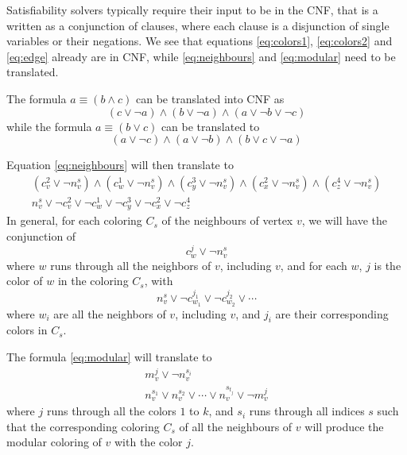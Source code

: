 \documentclass[letterpaper]{article}
\let\vel\vee
\let\at\wedge
\begin{document}
Satisfiability solvers typically require their input to be in the \ac{CNF}, that is
a written as a conjunction of clauses, where each clause is a disjunction of
single variables or their negations.  We see that equations \eqref{eq:colors1},
\eqref{eq:colors2} and \eqref{eq:edge} already are in \ac{CNF}, while
\eqref{eq:neighbours} and \eqref{eq:modular} need to be translated. 

The formula $a \equiv (b \at c)$ can be translated into \ac{CNF} as 
\begin{equation}
   \left(c \vee \neg a\right) \wedge \left(b \vee \neg a\right) \wedge \left(a \vee \neg b \vee \neg c\right)
   \label{eq:trans1}
\end{equation}
while the formula $a \equiv (b \vel c)$ can be translated to 
\begin{equation}
   \left(a \vee \neg c\right) \wedge \left(a \vee \neg b\right) \wedge \left(b \vee c \vee \neg a\right)
   \label{eq:trans2}
\end{equation}

Equation \eqref{eq:neighbours} will then translate to 
\begin{gather}
   \label{eq:neighbour_trans_1} (c_v^2 \vel \neg n_v^s) \at (c_w^1 \vel \neg n_v^s) \at (c_y^3 \vel \neg
   n_v^s) \at (c_x^2 \vel \neg n_v^s) \at (c_z^4 \vel \neg n_v^s)\\
   \label{eq:neighbour_trans_2} n_v^s \vel \neg c_v^2 \vel \neg c_w^1 \vel \neg c_y^3 \vel \neg
   c_x^2 \vel \neg c_z^4
\end{gather}
In general, for each coloring $C_s$ of the neighbours of vertex $v$, we will have the conjunction of 
\begin{equation}
   c_w^j \vel \neg n_v^s
   \label{eq:general_neighbour_1}
\end{equation}
where $w$ runs through all the neighbors of $v$, including $v$, and for each $w$, $j$ is the
color of $w$ in the coloring $C_s$, with 
\begin{equation}
   n_v^s \vel \neg c_{w_1}^{j_1} \vel \neg c_{w_2}^{j_2} \vel \cdots
   \label{eq:general_neighbour_2}
\end{equation}
where $w_i$ are all the neighbors of $v$, including $v$, and $j_i$ are their corresponding
colors in $C_s$. 

The formula \eqref{eq:modular} will translate to 
\begin{gather}
   \label{eq:modular_general_1} m_v^j \vel \neg n_v^{s_i}\\
   \label{eq:modular_general_2} n_v^{s_1} \vel n_v^{s_2} \vel \cdots \vel
   n_v^{s_{t_j}} \vel \neg m_v^j
\end{gather}
where $j$ runs through all the colors $1$ to $k$, and $s_i$ runs through all
indices $s$ such that the corresponding coloring $C_s$ of all the neighbours of
$v$ will produce the modular coloring of $v$ with the color $j$. 
\end{document}
